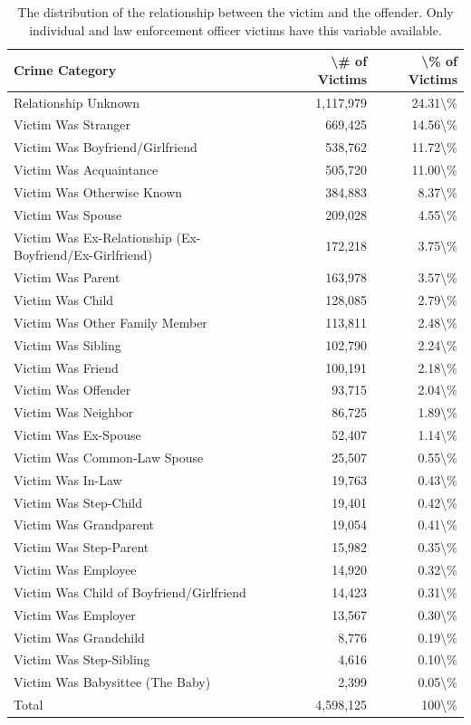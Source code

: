 \documentclass[
  12pt,
  openany]{book}
\begin{document}
\begin{longtable}[t]{lrr}
\caption{\label{tab:victimRelationship}The distribution of the relationship between the victim and the offender. Only individual and law enforcement officer victims have this variable available.}\\
\toprule
Crime Category & \textbackslash{}\# of Victims & \textbackslash{}\% of Victims\\
\midrule
Relationship Unknown & 1,117,979 & 24.31\textbackslash{}\%\\
Victim Was Stranger & 669,425 & 14.56\textbackslash{}\%\\
Victim Was Boyfriend/Girlfriend & 538,762 & 11.72\textbackslash{}\%\\
Victim Was Acquaintance & 505,720 & 11.00\textbackslash{}\%\\
Victim Was Otherwise Known & 384,883 & 8.37\textbackslash{}\%\\
\addlinespace
Victim Was Spouse & 209,028 & 4.55\textbackslash{}\%\\
Victim Was Ex-Relationship (Ex-Boyfriend/Ex-Girlfriend) & 172,218 & 3.75\textbackslash{}\%\\
Victim Was Parent & 163,978 & 3.57\textbackslash{}\%\\
Victim Was Child & 128,085 & 2.79\textbackslash{}\%\\
Victim Was Other Family Member & 113,811 & 2.48\textbackslash{}\%\\
\addlinespace
Victim Was Sibling & 102,790 & 2.24\textbackslash{}\%\\
Victim Was Friend & 100,191 & 2.18\textbackslash{}\%\\
Victim Was Offender & 93,715 & 2.04\textbackslash{}\%\\
Victim Was Neighbor & 86,725 & 1.89\textbackslash{}\%\\
Victim Was Ex-Spouse & 52,407 & 1.14\textbackslash{}\%\\
\addlinespace
Victim Was Common-Law Spouse & 25,507 & 0.55\textbackslash{}\%\\
Victim Was In-Law & 19,763 & 0.43\textbackslash{}\%\\
Victim Was Step-Child & 19,401 & 0.42\textbackslash{}\%\\
Victim Was Grandparent & 19,054 & 0.41\textbackslash{}\%\\
Victim Was Step-Parent & 15,982 & 0.35\textbackslash{}\%\\
\addlinespace
Victim Was Employee & 14,920 & 0.32\textbackslash{}\%\\
Victim Was Child of Boyfriend/Girlfriend & 14,423 & 0.31\textbackslash{}\%\\
Victim Was Employer & 13,567 & 0.30\textbackslash{}\%\\
Victim Was Grandchild & 8,776 & 0.19\textbackslash{}\%\\
Victim Was Step-Sibling & 4,616 & 0.10\textbackslash{}\%\\
\addlinespace
Victim Was Babysittee (The Baby) & 2,399 & 0.05\textbackslash{}\%\\
Total & 4,598,125 & 100\textbackslash{}\%\\
\bottomrule
\end{longtable}
\end{document}
